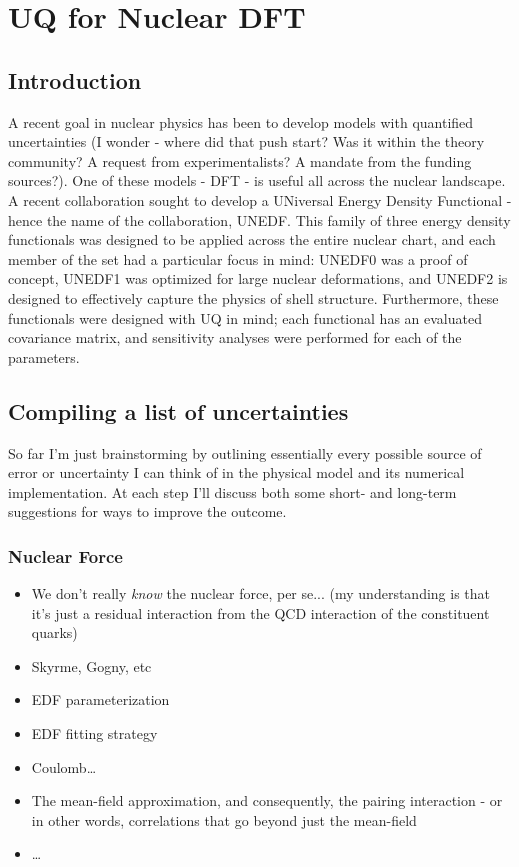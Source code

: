 \chapter{UQ for Nuclear DFT}

\section{Introduction}
A recent goal in nuclear physics has been to develop models with quantified uncertainties (I wonder - where did that push start? Was it within the theory community? A request from experimentalists? A mandate from the funding sources?). One of these models - DFT - is useful all across the nuclear landscape. A recent collaboration sought to develop a UNiversal Energy Density Functional - hence the name of the collaboration, UNEDF. This family of three energy density functionals was designed to be applied across the entire nuclear chart, and each member of the set had a particular focus in mind: UNEDF0 was a proof of concept, UNEDF1 was optimized for large nuclear deformations, and UNEDF2 is designed to effectively capture the physics of shell structure. Furthermore, these functionals were designed with UQ in mind; each functional has an evaluated covariance matrix, and sensitivity analyses were performed for each of the parameters.

\section{Compiling a list of uncertainties}
So far I'm just brainstorming by outlining essentially every possible source of error or uncertainty I can think of in the physical model and its numerical implementation. At each step I'll discuss both some short- and long-term suggestions for ways to improve the outcome.

\subsection{Nuclear Force}
\begin{itemize}
\item We don't really \textit{know} the nuclear force, per se... (my understanding is that it's just a residual interaction from the QCD interaction of the constituent quarks)
\item Skyrme, Gogny, etc
\item EDF parameterization
\item EDF fitting strategy
\item Coulomb\dots
\item The mean-field approximation, and consequently, the pairing interaction - or in other words, correlations that go beyond just the mean-field
\item \dots
\end{itemize}

